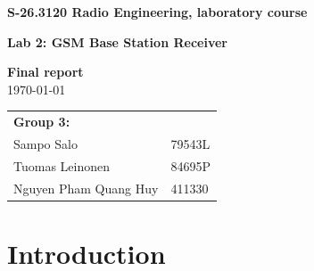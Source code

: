 \documentclass[a4paper, 12pt]{article}
\begin{document}
\begin{titlepage}
\pagestyle{empty}
\begin{center}

\vspace*{3cm}
\noindent\LARGE{\textbf{S-26.3120 Radio Engineering, laboratory course}}

\vspace*{2cm}

\Large{\textbf{Lab 2: GSM Base Station Receiver}}\\

\vspace*{1.5cm}

\large{\textbf{Final report}}\\
\vspace{1.5cm}
\large{\today}
	
\vspace*{3cm}
\large{
	\begin{tabular}{l l}
		\textbf{Group 3:} 	& \\
		Sampo Salo			& 79543L	\\
		Tuomas Leinonen 	& 84695P	\\
		Nguyen Pham Quang Huy			& 411330		
	\end{tabular}
}

\end{center}

\end{titlepage}


\section{Introduction}
\end{document}
